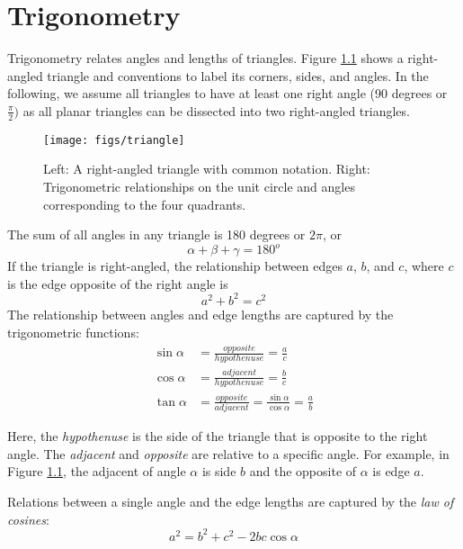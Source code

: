 \chapter{Trigonometry}
Trigonometry relates angles and lengths of triangles. Figure \ref{fig:triangle} shows a right-angled triangle and conventions to label its corners, sides, and angles. In the following, we assume all triangles to have at least one right angle (90 degrees or $\frac{\pi}{2})$ as all planar triangles can be dissected into two right-angled triangles. 

\begin{figure}[!htb]
\centering
\texttt{[image: figs/triangle]}
\caption{Left: A right-angled triangle with common notation. Right: Trigonometric relationships on the unit circle and angles corresponding to the four quadrants. \label{fig:triangle}}
\end{figure}

The sum of all angles in any triangle is 180 degrees or $2\pi$, or 
\begin{equation}
\alpha + \beta + \gamma = 180^o
\end{equation}
If the triangle is right-angled, the relationship between edges $a$, $b$, and $c$, where $c$ is the edge opposite of the right angle is
\begin{equation}
a^2+b^2=c^2
\end{equation} 
The relationship between angles and edge lengths are captured by the trigonometric functions:
\begin{eqnarray}
\sin{\alpha}&=\frac{opposite}{hypothenuse}=\frac{a}{c}\\
\cos{\alpha}&=\frac{adjacent}{hypothenuse}=\frac{b}{c}\\
\tan{\alpha}&=\frac{opposite}{adjacent}=\frac{\sin{\alpha}}{\cos{\alpha}}=\frac{a}{b}
\end{eqnarray} 

Here, the \emph{hypothenuse} is the side of the triangle that is opposite to the right angle. The \emph{adjacent} and \emph{opposite} are relative to a specific angle. For example, in Figure \ref{fig:triangle}, the adjacent of angle $\alpha$ is side $b$ and the opposite of $\alpha$ is edge $a$. 

Relations between a single angle and the edge lengths are captured by the \emph{law of cosines}:
\begin{equation}
a^2=b^2+c^2-2bc\cos{\alpha}
\end{equation}

